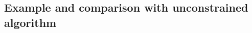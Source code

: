 \documentclass{article}
\DeclareMathOperator*{\argmin}{arg\,min}
\begin{document}



\subsection{Example and comparison with unconstrained algorithm}
\end{document}
